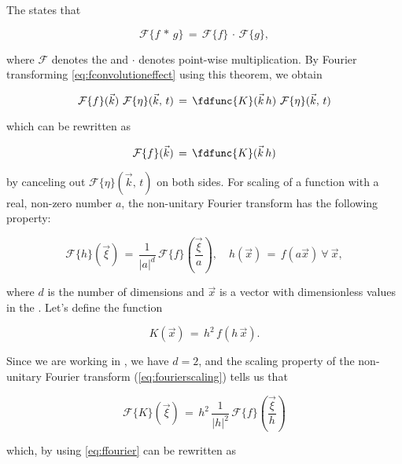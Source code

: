 The  states that

\begin{equation} \label{eq:convolutiontheorem}
\mathcal{F}\{f\,*\,g\} \,=\, \mathcal{F}\{f\}\,\cdot\,\mathcal{F}\{g\},
\end{equation}

where $\mathcal{F}$ denotes the  and $\cdot$ denotes point-wise multiplication. By Fourier transforming \eqref{eq:fconvolutioneffect} using this theorem, we obtain

\begin{equation}
\mathcal{F}\{f\}(\vec{k})\ \mathcal{F}\{\eta\}(\vec{k},\,t) \,=\, \fdfunc{K}(\vec{k}\,h)\ \mathcal{F}\{\eta\}(\vec{k},\,t)
\end{equation}

which can be rewritten as

\begin{equation} \label{eq:ffourier}
\mathcal{F}\{f\}(\vec{k}) \,=\, \fdfunc{K}(\vec{k}\,h)
\end{equation}

by canceling out $\mathcal{F}\{\eta\}(\vec{k},\,t)$ on both sides. For scaling of a function with a real, non-zero number $a$, the non-unitary Fourier transform has the following property:

\begin{equation} \label{eq:fourierscaling}
\mathcal{F}\{h\}(\vec{\xi}) \,=\, \frac{1}{|a|^d}\,\mathcal{F}\{f\}\left(\frac{\vec{\xi}}{a}\right)
,\quad
h(\vec{x}) \,=\, f(a\vec{x})\ \forall\ \vec{x},
\end{equation}

where $d$ is the number of dimensions and $\vec{x}$ is a vector with dimensionless values in the . Let's define the function

\begin{equation} \label{eq:ftokernel}
K(\vec{x}) \,=\, h^2\,f(h\,\vec{x}).
\end{equation}

Since we are working in , we have $d = 2$, and the scaling property of the non-unitary Fourier transform (\eqref{eq:fourierscaling}) tells us that

\begin{equation}
\mathcal{F}\{K\}(\vec{\xi}) \,=\, h^2\,\frac{1}{|h|^2}\,\mathcal{F}\{f\}\left(\frac{\vec{\xi}}{h}\right)
\end{equation}

which, by using \eqref{eq:ffourier} can be rewritten as

